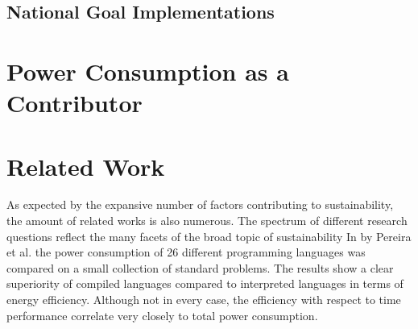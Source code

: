 \subsection{National Goal Implementations}\label{subsec:nationalGoals}

\section{Power Consumption as a Contributor}\label{sec:powerConsumption}

\section{Related Work}\label{sec:relatedWork}

As expected by the expansive number of factors contributing to sustainability, the amount of related works is also numerous. The spectrum of different research questions reflect the many facets of the broad topic of sustainability
In \cite{10.1145/3136014.3136031} by Pereira et al. the power consumption of 26 different programming languages was compared on a small collection of standard problems. The results show a clear superiority of compiled languages compared to interpreted languages in terms of energy efficiency. Although not in every case, the efficiency with respect to time performance correlate very closely to total power consumption.